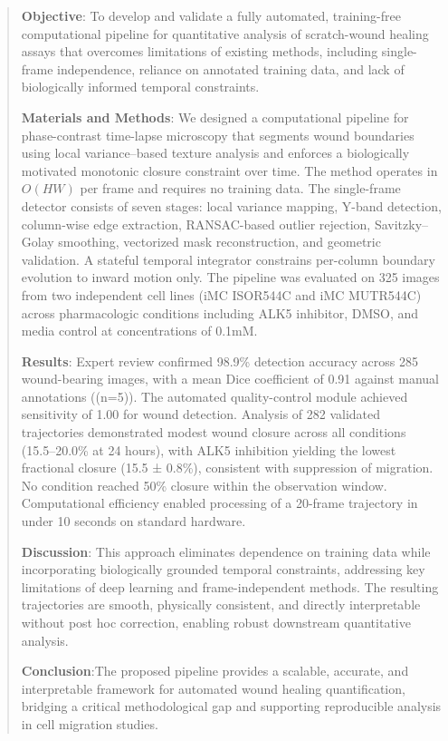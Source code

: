 \begin{abstract}

\textbf{Objective}: To develop and validate a fully automated, training-free computational pipeline for quantitative analysis of scratch-wound healing assays that overcomes limitations of existing methods, including single-frame independence, reliance on annotated training data, and lack of biologically informed temporal constraints.

\textbf{Materials and Methods}: We designed a computational pipeline for phase-contrast time-lapse microscopy that segments wound boundaries using local variance–based texture analysis and enforces a biologically motivated monotonic closure constraint over time. The method operates in $O(HW)$ per frame and requires no training data. The single-frame detector consists of seven stages: local variance mapping, Y-band detection, column-wise edge extraction, RANSAC-based outlier rejection, Savitzky–Golay smoothing, vectorized mask reconstruction, and geometric validation. A stateful temporal integrator constrains per-column boundary evolution to inward motion only. The pipeline was evaluated on 325 images from two independent cell lines (iMC ISOR544C and iMC MUTR544C) across pharmacologic conditions including ALK5 inhibitor, DMSO, and media control at concentrations of 0.1mM.

\textbf{Results}: Expert review confirmed 98.9\% detection accuracy across 285 wound-bearing images, with a mean Dice coefficient of 0.91 against manual annotations ((n=5)). The automated quality-control module achieved sensitivity of 1.00 for wound detection. Analysis of 282 validated trajectories demonstrated modest wound closure across all conditions (15.5–20.0\% at 24 hours), with ALK5 inhibition yielding the lowest fractional closure (15.5 ± 0.8\%), consistent with suppression of migration. No condition reached 50\% closure within the observation window. Computational efficiency enabled processing of a 20-frame trajectory in under 10 seconds on standard hardware.

\textbf{Discussion}: This approach eliminates dependence on training data while incorporating biologically grounded temporal constraints, addressing key limitations of deep learning and frame-independent methods. The resulting trajectories are smooth, physically consistent, and directly interpretable without post hoc correction, enabling robust downstream quantitative analysis.

\textbf{Conclusion}:The proposed pipeline provides a scalable, accurate, and interpretable framework for automated wound healing quantification, bridging a critical methodological gap and supporting reproducible analysis in cell migration studies.




\end{abstract}


